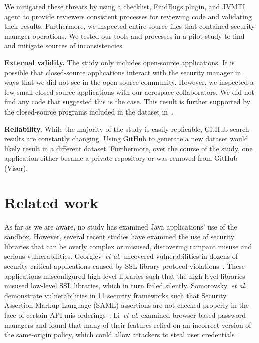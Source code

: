 \documentclass{sig-alternate-05-2015}
\newcommand{\minisec}[1]{\noindent\textbf{#1}}
\begin{document}
We mitigated these threats by using a checklist, FindBugs plugin, and JVMTI agent to
provide reviewers consistent processes for reviewing code
and validating their results. Furthermore,
we inspected entire source files that contained
security manager operations. We tested our tools and processes in a pilot study
to find and mitigate sources of inconsistencies.

\minisec{External validity.}
The study only includes open-source applications. It is possible
that closed-source applications interact with the security manager
in ways that we did not see in the open-source community. However,
we inspected a few small closed-source applications with our aerospace collaborators.
We did not find any code that suggested this is the case.  This result is
further supported by the closed-source programs included in the dataset
in~. 

\minisec{Reliability.}
While the majority of the study is easily replicable, GitHub search results are constantly
changing. Using GitHub to generate a new dataset
would likely result in a different dataset. Furthermore, over the course of the
study, one application either became a private repository
or was removed from GitHub (Visor).

\section{Related work}
\label{sec:related}

As far
as we are aware, no study has examined Java applications' use of the
sandbox. However, several recent studies have examined the use of security
libraries that can be overly complex or 
misused, discovering rampant misuse and
serious vulnerabilities.
Georgiev~\emph{et al.} uncovered vulnerabilities in dozens of security critical
applications caused by SSL library protocol violations~\cite{georgiev12most-dangerous}.
These applications misconfigured high-level libraries such that the
high-level libraries misused low-level SSL libraries, which in turn
failed silently. Somorovsky~\emph{et al.} demonstrate vulnerabilities in
11 security frameworks such that Security Assertion Markup Language
(SAML) assertions are not checked properly in the face of certain API
mis-orderings~\cite{somorovsky12breaking}. Li~\emph{et al.} examined
browser-based  
password managers and found that many of their features relied on
an incorrect version of the same-origin policy, which could allow
attackers to steal user credentials~\cite{li2014emperor}.
\end{document}
